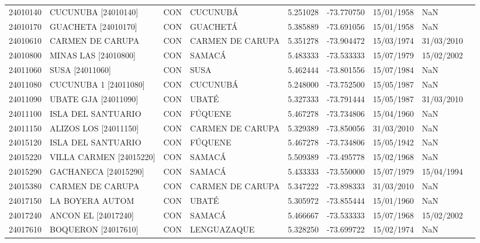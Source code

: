 \begin{landscape}
\begin{longtable}{lp{4cm}lp{3cm}lrrll}
   24010140 &         CUCUNUBA [24010140] &  CON &          CUCUNUBÁ &  5.251028 & -73.770750 &  15/01/1958 &         NaN \\
   24010170 &         GUACHETA [24010170] &  CON &          GUACHETÁ &  5.385889 & -73.691056 &  15/01/1958 &         NaN \\
   24010610 &            CARMEN DE CARUPA &  CON &  CARMEN DE CARUPA &  5.351278 & -73.904472 &  15/03/1974 &  31/03/2010 \\
   24010800 &        MINAS LAS [24010800] &  CON &            SAMACÁ &  5.483333 & -73.533333 &  15/07/1979 &  15/02/2002 \\
   24011060 &             SUSA [24011060] &  CON &              SUSA &  5.462444 & -73.801556 &  15/07/1984 &         NaN \\
   24011080 &       CUCUNUBA 1 [24011080] &  CON &          CUCUNUBÁ &  5.248000 & -73.752500 &  15/05/1987 &         NaN \\
   24011090 &        UBATE GJA [24011090] &  CON &             UBATÉ &  5.327333 & -73.791444 &  15/05/1987 &  31/03/2010 \\
   24011100 &          ISLA DEL SANTUARIO &  CON &           FÚQUENE &  5.467278 & -73.734806 &  15/04/1960 &         NaN \\
   24011150 &       ALIZOS LOS [24011150] &  CON &  CARMEN DE CARUPA &  5.329389 & -73.850056 &  31/03/2010 &         NaN \\
   24015120 &          ISLA DEL SANTUARIO &  CON &           FÚQUENE &  5.467278 & -73.734806 &  15/05/1942 &         NaN \\
   24015220 &   VILLA CARMEN   [24015220] &  CON &            SAMACÁ &  5.509389 & -73.495778 &  15/02/1968 &         NaN \\
   24015290 &        GACHANECA [24015290] &  CON &            SAMACÁ &  5.433333 & -73.550000 &  15/07/1979 &  15/04/1994 \\
   24015380 &            CARMEN DE CARUPA &  CON &  CARMEN DE CARUPA &  5.347222 & -73.898333 &  31/03/2010 &         NaN \\
   24017150 &             LA BOYERA AUTOM &  CON &             UBATÉ &  5.305972 & -73.855444 &  15/01/1960 &         NaN \\
   24017240 &         ANCON EL [24017240] &  CON &            SAMACÁ &  5.466667 & -73.533333 &  15/07/1968 &  15/02/2002 \\
   24017610 &      BOQUERON    [24017610] &  CON &       LENGUAZAQUE &  5.328250 & -73.699722 &  15/02/1974 &         NaN \\

\end{longtable}
\end{landscape}
